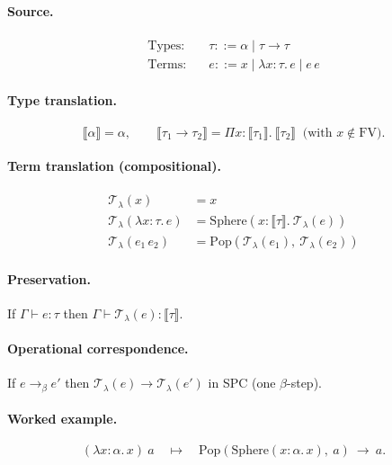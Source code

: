 \documentclass{article}
\begin{document}
\paragraph{Source.}
\[
\begin{aligned}
\text{Types:}&\quad \tau ::= \alpha \mid \tau \to \tau \\
\text{Terms:}&\quad e ::= x \mid \lambda x{:}\tau.\,e \mid e\,e
\end{aligned}
\]

\paragraph{Type translation.}
\[
\llbracket \alpha \rrbracket = \alpha, \qquad
\llbracket \tau_1 \to \tau_2 \rrbracket = \Pi x{:}\llbracket \tau_1 \rrbracket.\ \llbracket \tau_2 \rrbracket
\ \text{ (with } x\notin \mathrm{FV}).
\]

\paragraph{Term translation (compositional).}
\[
\begin{aligned}
\mathcal{T}_\lambda(x) &= x \\
\mathcal{T}_\lambda(\lambda x{:}\tau.\,e) &= \mathrm{Sphere}(x{:}\llbracket \tau \rrbracket.\ \mathcal{T}_\lambda(e)) \\
\mathcal{T}_\lambda(e_1\,e_2) &= \mathrm{Pop}(\mathcal{T}_\lambda(e_1),\ \mathcal{T}_\lambda(e_2))
\end{aligned}
\]

\paragraph{Preservation.}
If $\Gamma \vdash e : \tau$ then $\Gamma \vdash \mathcal{T}_\lambda(e) : \llbracket \tau \rrbracket$.

\paragraph{Operational correspondence.}
If $e \to_\beta e'$ then $\mathcal{T}_\lambda(e) \to \mathcal{T}_\lambda(e')$ in SPC (one $\beta$-step).

\paragraph{Worked example.}
\[
(\lambda x{:}\alpha.\,x)\ a
\quad\mapsto\quad
\mathrm{Pop}(\mathrm{Sphere}(x{:}\alpha.\,x),\ a)
\ \to\ a.
\]
\end{document}
